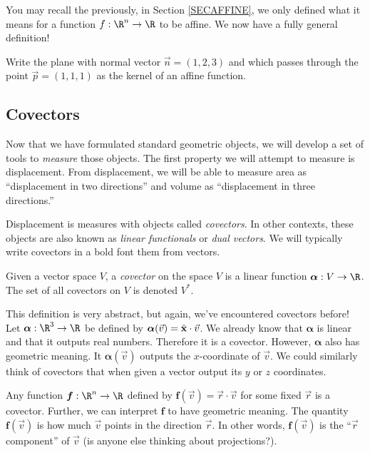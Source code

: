 You may recall the previously, in Section \ref{SECAFFINE},
we only defined what it means for a function $f:\R^n\to \R$
to be affine.
We now have a fully general
definition!

\begin{exercise}
	Write the plane with normal vector $\vec n=(1,2,3)$ and which
	passes through the point $\vec p=(1,1,1)$ as the kernel of an 
	affine function.
\end{exercise}

\subsection{Covectors}

Now that we have formulated standard geometric objects, we will develop
a set of tools to \emph{measure} those objects.  The first
property we will attempt to measure is displacement.  From displacement,
we will be able to measure area as ``displacement in two directions''
and volume as ``displacement in three directions.''

Displacement is measures with objects called \emph{covectors}.
In other contexts, these objects are also known as 
\emph{linear functionals} or \emph{dual vectors}.
We will typically write covectors in a bold font them from vectors.

\begin{definition}[Covector]
	Given a vector space $V$, a \emph{covector} on the space $V$
	is a linear function $\bm{\alpha}:V\to \R$.  The set of all
	covectors on $V$ is denoted $V^*$.
\end{definition}

This definition is very abstract, but again, we've encountered covectors
before!  Let $\bm{\alpha}:\R^3\to\R$ be defined by $\bm{\alpha}(\vec v) ={\hat {\mathbf x}} \cdot \vec v$.
We already know that $\bm{\alpha}$ is linear and that it outputs
real numbers.  Therefore it is a covector.  However, $\bm \alpha$ also has
geometric meaning.  It $\bm\alpha(\vec v)$ outputs the $x$-coordinate
of $\vec v$.  We could similarly think of covectors that when given
a vector output its $y$ or $z$ coordinates.

Any function $\bm f:\R^n\to \R$ defined by $\bm f(\vec v) = \vec r\cdot \vec v$
for some fixed $\vec r$ is a covector.  Further, we can interpret
$\bm f$ to have geometric meaning.  The quantity $\bm f(\vec v)$ is how
much $\vec v$ points in the direction $\vec r$.  In other words, $\bm f(\vec v)$
is the ``$\vec r$ component'' of $\vec v$ (is anyone else thinking
about projections?).

